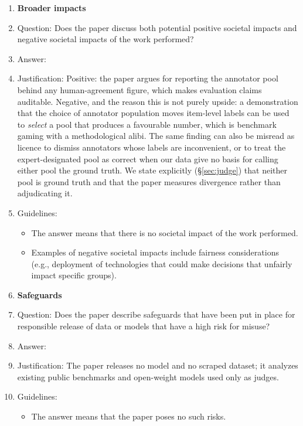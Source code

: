 \documentclass{article}
\begin{document}
\begin{enumerate}
\item {\bf Broader impacts}
    \item[] Question: Does the paper discuss both potential positive societal impacts and negative societal impacts of the work performed?
    \item[] Answer: \answerYes{}
    \item[] Justification: Positive: the paper argues for reporting the annotator pool behind any human-agreement figure, which makes evaluation claims auditable. Negative, and the reason this is not purely upside: a demonstration that the choice of annotator population moves item-level labels can be used to \emph{select} a pool that produces a favourable number, which is benchmark gaming with a methodological alibi. The same finding can also be misread as licence to dismiss annotators whose labels are inconvenient, or to treat the expert-designated pool as correct when our data give no basis for calling either pool the ground truth. We state explicitly (\S\ref{sec:judge}) that neither pool is ground truth and that the paper measures divergence rather than adjudicating it.
    \item[] Guidelines:
    \begin{itemize}
        \item The answer \answerNA{} means that there is no societal impact of the work performed.
        \item Examples of negative societal impacts include fairness considerations (e.g., deployment of technologies that could make decisions that unfairly impact specific groups).
    \end{itemize}

\item {\bf Safeguards}
    \item[] Question: Does the paper describe safeguards that have been put in place for responsible release of data or models that have a high risk for misuse?
    \item[] Answer: \answerNA{}
    \item[] Justification: The paper releases no model and no scraped dataset; it analyzes existing public benchmarks and open-weight models used only as judges.
    \item[] Guidelines:
    \begin{itemize}
        \item The answer \answerNA{} means that the paper poses no such risks.
    \end{itemize}


\end{enumerate}
\end{document}

